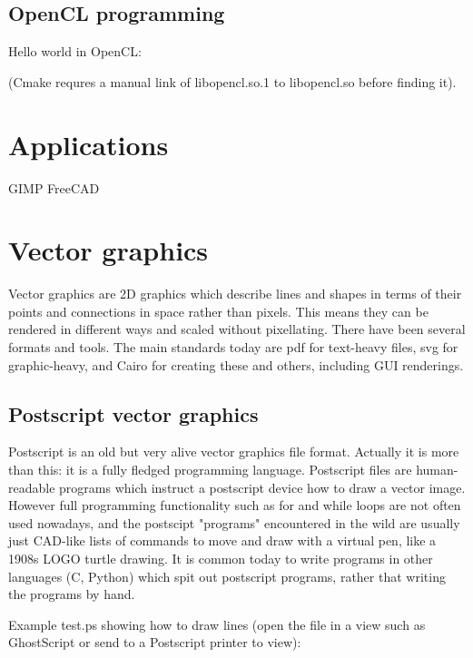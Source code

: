 \documentclass[oneside,english]{scrbook}
\begin{document}
\section{OpenCL programming}

Hello world in OpenCL:



(Cmake requres a manual link of libopencl.so.1 to libopencl.so before finding it).




\chapter{Applications}

GIMP
FreeCAD





\chapter{Vector graphics}

Vector graphics are 2D graphics which describe lines and shapes in terms of their points and connections in space rather than pixels. This means they can be rendered in different ways and scaled without pixellating.  There have been several formats and tools. The main standards today are pdf for text-heavy files, svg for graphic-heavy, and Cairo for creating these and others, including GUI renderings.

\section{Postscript vector graphics}

Postscript is an old but very alive vector graphics file format. Actually it is more than this: it is a fully fledged programming language.   Postscript files are human-readable programs which instruct a postscript device how to draw a vector image.  However full programming functionality such as for and while loops are not often used nowadays, and the postscipt "programs" encountered in the wild are usually just CAD-like lists of commands to move and draw with a virtual pen, like a 1908s LOGO turtle drawing.  It is common today to write programs in other languages (C, Python) which spit out postscript programs, rather that writing the programs by hand.

Example test.ps showing how to draw lines (open the file in a view such as GhostScript or send to a Postscript printer to view):

\end{document}
